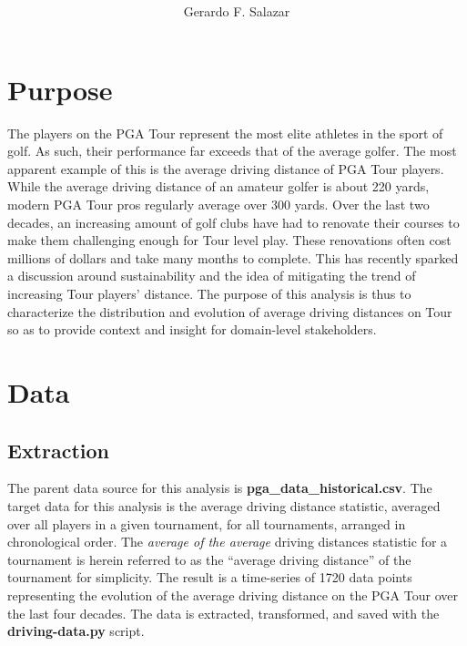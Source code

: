 \documentclass[11pt]{article}
\begin{document}
\author{Gerardo F. Salazar}
\title{\\[5pt]
\vspace{-2.0ex}}
\date{}
\maketitle
\vspace{-1cm}

\begin{multicols}{2}
\section{Purpose}
The players on the PGA Tour represent the most elite athletes in the sport of golf. As such, their performance far exceeds that of the average golfer. The most apparent example of this is the average driving distance of PGA Tour players. While the average driving distance of an amateur golfer is about 220 yards, modern PGA Tour pros regularly average over 300 yards. Over the last two decades, an increasing amount of golf clubs have had to renovate their courses to make them challenging enough for Tour level play. These renovations often cost millions of dollars and take many months to complete. This has recently sparked a discussion around sustainability and the idea of mitigating the trend of increasing Tour players' distance. The purpose of this analysis is thus to characterize the distribution and evolution of average driving distances on Tour so as to provide context and insight for domain-level stakeholders.
\section{Data}
\subsection{Extraction}
The parent data source for this analysis is \textbf{pga\_data\_historical.csv}. The target data for this analysis is the average driving distance statistic, averaged over all players in a given tournament, for all tournaments, arranged in chronological order. The \textit{average of the average} driving distances statistic for a tournament is herein referred to as the ``average driving distance'' of the tournament for simplicity. The result is a time-series of 1720 data points representing the evolution of the average driving distance on the PGA Tour over the last four decades. The data is extracted, transformed, and saved with the \textbf{driving-data.py} script.

\end{multicols}
\end{document}

